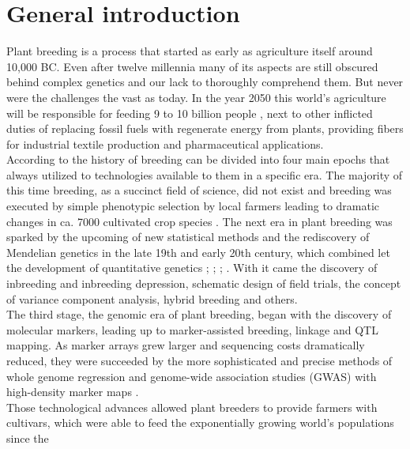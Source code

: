 
\chapter{General introduction} %
\label{Chapter0} %


Plant breeding is a process that started as early as agriculture itself around 10,000
BC. Even after twelve millennia many of its aspects are still obscured behind complex
genetics and our lack to thoroughly comprehend them. But never were the challenges the
vast as today. In the year 2050 this world's agriculture will be responsible for feeding 9
to 10 billion people \cite{gerland2014world}, next to other inflicted duties of replacing
fossil fuels with regenerate energy from plants, providing fibers for industrial textile
production and pharmaceutical applications. \\
According to \cite{wallace2018road} the history of breeding can be divided into four main
epochs that always utilized to technologies available to them in a specific era. The
majority of this time breeding, as a succinct field of science, did not exist and breeding
was executed by simple phenotypic selection by local farmers leading to dramatic changes
in ca. 7000 cultivated crop species \cite{khoury2016origins}. The next era in plant
breeding was sparked by the upcoming of new statistical methods and the rediscovery of
Mendelian genetics in the late 19th and early 20th century, which combined let the
development of quantitative genetics \cite{tschermak1900kunstliche}; \cite{fisher1919xv};
\cite{fisher1923}; \cite{falconer1996}. With it came the discovery of inbreeding and
inbreeding depression, schematic design of field trials, the concept of variance component analysis, hybrid breeding and others. \\
The third stage, the genomic era of plant breeding, began with the discovery of molecular
markers, leading up to marker-assisted breeding, linkage and QTL mapping. As marker arrays
grew larger and sequencing costs dramatically reduced, they were succeeded by the more
sophisticated and precise methods of whole genome regression and genome-wide association
studies (GWAS) with high-density marker maps \cite{hayes2001,korte2013advantages}. \\
Those technological advances allowed plant breeders to provide farmers with cultivars,
which were able to feed the exponentially growing world's populations since the
